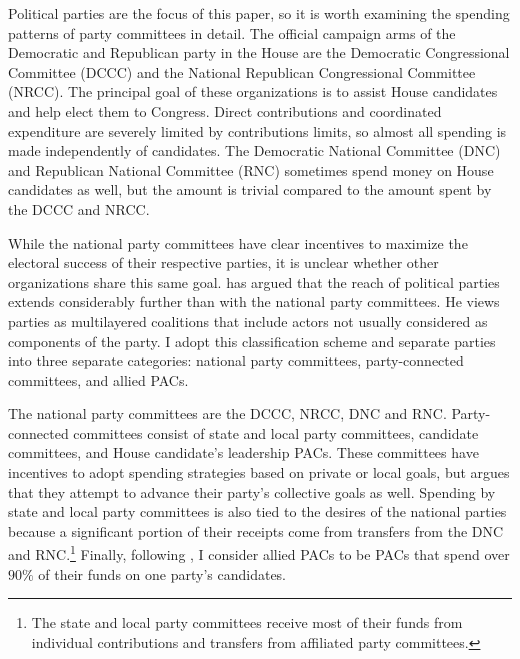 \documentclass[12pt,final,fleqn]{article}
\theoremstyle{plain}
\begin{document}
Political parties are the focus of this paper, so it is worth examining the spending patterns of party committees in detail. The official campaign arms of the Democratic and Republican party in the House are the Democratic Congressional Committee (DCCC) and the National Republican Congressional Committee (NRCC). The principal goal of these organizations is to assist House candidates and help elect them to Congress. Direct contributions and coordinated expenditure are severely limited by contributions limits, so almost all spending is made independently of candidates. The Democratic National Committee (DNC) and Republican National Committee (RNC) sometimes spend money on House candidates as well, but the amount is trivial compared to the amount spent by the DCCC and NRCC.

While the national party committees have clear incentives to maximize the electoral success of their respective parties, it is unclear whether other organizations share this same goal. \citet{herrnson2009roles} has argued that the reach of political parties extends considerably further than with the national party committees. He views parties as multilayered coalitions that include actors not usually considered as components of the party. I adopt this classification scheme and separate parties into three separate categories: national party committees, party-connected committees, and allied PACs. 

The national party committees are the DCCC, NRCC, DNC and RNC. Party-connected committees consist of state and local party committees, candidate committees, and House candidate's leadership PACs. These committees have incentives to adopt spending strategies based on private or local goals, but \citet{herrnson2009roles} argues that they attempt to advance their party's collective goals as well. Spending by state and local party committees is also tied to the desires of the national parties because a significant portion of their receipts come from transfers from the DNC and RNC.\footnote{The state and local party committees receive most of their funds from individual contributions and transfers from affiliated party committees.} Finally, following \citet{herrnson2009roles}, I consider allied PACs to be PACs that spend over $90\%$ of their funds on one party's candidates.
\end{document}
